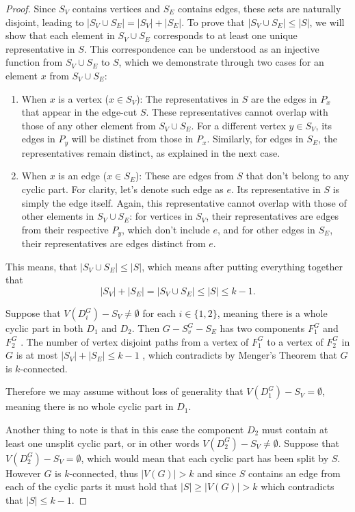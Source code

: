 \documentclass[12pt, twoside]{book}
\begin{document}
\begin{proof}
	Since $S_V$ contains vertices and $S_E$ contains edges, these sets are naturally disjoint, leading to $|S_V\cup S_E|=|S_V|+|S_E|$. To prove that $|S_V\cup S_E|\leq |S|$, we will show that each element in $S_V\cup S_E$ corresponds to at least one unique representative in $S$. This correspondence can be understood as an injective function from $S_V\cup S_E$ to $S$, which we demonstrate through two cases for an element $x$ from $S_V\cup S_E$:
	\begin{enumerate}
		\item When $x$ is a vertex ($x\in S_V$): The representatives in $S$ are the edges in $P_x$ that appear in the edge-cut $S$. These representatives cannot overlap with those of any other element from $S_V\cup S_E$. For a different vertex $y\in S_V$, its edges in $P_y$ will be distinct from those in $P_x$. Similarly, for edges in $S_E$, the representatives remain distinct, as explained in the next case.
		\item When $x$ is an edge ($x\in S_E$): These are edges from $S$ that don't belong to any cyclic part. For clarity, let's denote such edge as $e$. Its representative in $S$ is simply the edge itself. Again, this representative cannot overlap with those of other elements in $S_V\cup S_E$: for vertices in $S_V$, their representatives are edges from their respective $P_y$, which don't include $e$, and for other edges in $S_E$, their representatives are edges distinct from $e$.
	\end{enumerate} 
	
	This means, that $|S_V\cup S_E|\leq |S|$, which means after putting everything together that $$|S_V|+|S_E|=|S_V\cup S_E|\leq |S|\leq k-1.$$
	
	Suppose that $V(D_i^G)-S_V\neq\emptyset$ for each $i\in \{1,2\}$, meaning there is a whole cyclic part in both $D_1$ and $D_2$. Then $G-S_v^G-S_E$ has two components $F_1^G$ and $F_2^G$ . The number of vertex disjoint paths from a vertex of $F_1^G$ to a vertex of $F_2^G$ in $G$ is at most $|S_V|+|S_E|\leq k-1$ , which contradicts by Menger's Theorem that $G$ is $k$-connected.
	
	Therefore we may assume without loss of generality that $V(D_1^G)-S_V=\emptyset$, meaning there is no whole cyclic part in $D_1$.
	
	Another thing to note is that in this case the component $D_2$ must contain at least one unsplit cyclic part, or in other words $V(D_2^G)-S_V\neq\emptyset$. Suppose that $V(D_2^G)-S_V=\emptyset$, which would mean that each cyclic part has been split by $S$. However $G$ is $k$-connected, thus $|V(G)|>k$ and since $S$ contains an edge from each of the cyclic parts it must hold that $|S|\geq |V(G)|>k$ which contradicts that $|S|\leq k-1$.
	

\end{proof}
\end{document}
